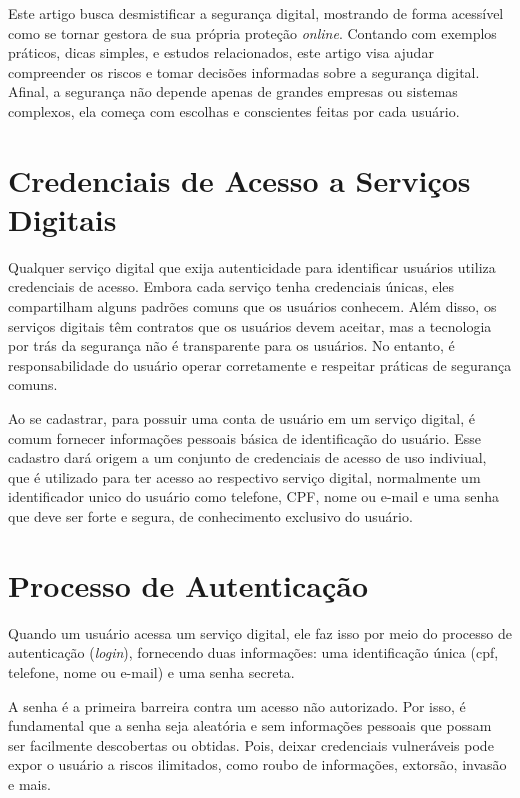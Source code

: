 \documentclass[12pt]{article}
\begin{document}
Este artigo busca desmistificar a segurança digital, mostrando de forma acessível como
se tornar gestora de sua própria proteção \textit{online}.
Contando com exemplos práticos, dicas simples, e estudos relacionados, este artigo
visa ajudar compreender os riscos e tomar decisões informadas sobre a segurança digital.
Afinal, a segurança não depende apenas de grandes empresas ou sistemas complexos,
ela começa com escolhas e conscientes feitas por cada usuário.

\section{Credenciais de Acesso a Serviços Digitais} \label{sec:firstpage}

Qualquer serviço digital que exija autenticidade para identificar usuários
utiliza credenciais de acesso.
Embora cada serviço tenha credenciais únicas, eles compartilham alguns
padrões comuns que os usuários conhecem.
Além disso, os serviços digitais têm contratos que os usuários devem aceitar,
mas a tecnologia por trás da segurança não é transparente para os usuários.
No entanto, é responsabilidade do usuário operar corretamente e respeitar
práticas de segurança comuns.

Ao se cadastrar, para possuir uma conta de usuário em um serviço digital,
é comum fornecer informações pessoais básica de identificação do usuário.
Esse cadastro dará origem a um conjunto de credenciais de acesso de uso
indiviual, que é utilizado para ter acesso ao respectivo serviço digital,
normalmente um identificador unico do usuário como telefone, CPF, nome ou
e-mail e uma senha que deve ser forte e segura, de conhecimento exclusivo
do usuário.

\section{Processo de Autenticação}

Quando um usuário acessa um serviço digital, ele faz isso por meio do
processo de autenticação (\textit{login}), fornecendo duas informações: uma
identificação única (cpf, telefone, nome ou e-mail) e uma senha secreta.

A senha é a primeira barreira contra um acesso não autorizado.
Por isso, é fundamental que a senha seja aleatória e sem informações
pessoais que possam ser facilmente descobertas ou obtidas.
Pois, deixar credenciais vulneráveis pode expor o usuário a riscos ilimitados,
como roubo de informações, extorsão, invasão e mais.
\end{document}
